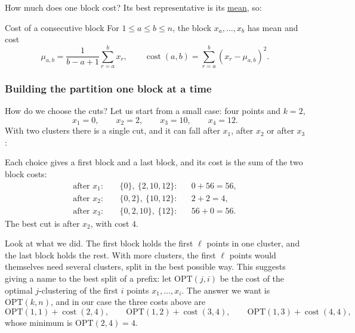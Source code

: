 \documentclass[a4paper,12pt,oneside]{report}
\newcommand{\OPT}{\mathrm{OPT}}
\begin{document}
How much does one block cost? Its best representative is its
\hyperref[prop:k-means-one]{mean}, so:

\begin{frameddefn}{Cost of a consecutive block}
\label{def:kmeans-block-cost}
For $1\leq a\leq b\leq n$, the block $x_a,\ldots,x_b$ has mean and
cost
\[
  \mu_{a,b}=\frac{1}{b-a+1}\sum_{r=a}^{b}x_r,
  \qquad
  \operatorname{cost}(a,b)=\sum_{r=a}^{b}(x_r-\mu_{a,b})^2.
\]
\end{frameddefn}

\subsubsection{Building the partition one block at a time}

How do we choose the cuts? Let us start from a small case: four points
and $k=2$,
\[
  x_1=0,\qquad x_2=2,\qquad x_3=10,\qquad x_4=12 .
\]
With two clusters there is a single cut, and it can fall after $x_1$,
after $x_2$ or after $x_3$:
\begin{center}
\end{center}
Each choice gives a first block and a last block, and its cost is the
sum of the two block costs:
\[
\begin{aligned}
  \text{after }x_1:&\quad \{0\},\ \{2,10,12\}: && 0+56=56,\\
  \text{after }x_2:&\quad \{0,2\},\ \{10,12\}: && 2+2=4,\\
  \text{after }x_3:&\quad \{0,2,10\},\ \{12\}: && 56+0=56.
\end{aligned}
\]
The best cut is after $x_2$, with cost $4$.

Look at what we did. The first block holds the first $\ell$ points in
one cluster, and the last block holds the rest. With more clusters,
the first $\ell$ points would themselves need several clusters, split
in the best possible way. This suggests giving a name to the best
split of a prefix: let $\OPT(j,i)$ be the cost of the optimal
$j$-clustering of the first $i$ points $x_1,\ldots,x_i$. The answer we
want is $\OPT(k,n)$, and in our case the three costs above are
\[
  \OPT(1,1)+\operatorname{cost}(2,4),\qquad
  \OPT(1,2)+\operatorname{cost}(3,4),\qquad
  \OPT(1,3)+\operatorname{cost}(4,4),
\]
whose minimum is $\OPT(2,4)=4$.
\end{document}
